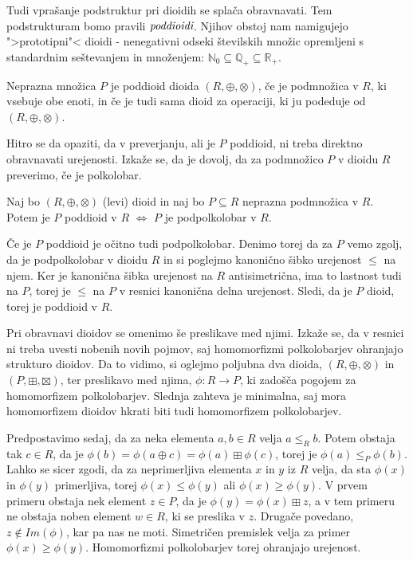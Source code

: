 \documentclass[mat1]{fmfdelo}
\newcommand{\N}{\mathbb{N}}
\newcommand{\No}{\N_0}
\newcommand{\Pplus}[1]{\mathbb{#1}_{+}}
\newcommand{\pojem}[1]{\ensuremath{\emph{#1}}}
\newcommand{\map}[3]{\ensuremath{{#1}:{#2}\rightarrow{#3}}}
\begin{document}
Tudi vprašanje podstruktur pri dioidih se splača obravnavati. Tem podstrukturam bomo pravili \pojem{poddioidi}. Njihov obstoj nam namigujejo ">prototipni"< dioidi - nenegativni odseki številskih množic opremljeni s standardnim seštevanjem in množenjem: $\No\subseteq\Pplus{Q}\subseteq\Pplus{R}$.

\begin{definicija}
	Neprazna množica $P$ je poddioid dioida $(R, \oplus, \otimes)$, če je podmnožica v $R$, ki vsebuje obe enoti, in če je tudi sama dioid za operaciji, ki ju podeduje od $(R, \oplus, \otimes)$.
\end{definicija}

Hitro se da opaziti, da v preverjanju, ali je $P$ poddioid, ni treba direktno obravnavati urejenosti. Izkaže se, da je dovolj, da za podmnožico $P$ v dioidu $R$ preverimo, če je polkolobar.

\begin{trditev}
	\label{trd:poddioid}
	Naj bo $(R, \oplus, \otimes)$ (levi) dioid in naj bo $P\subseteq R$ neprazna podmnožica v $R$. Potem je $P$ poddioid v $R$ $\iff$ $P$ je podpolkolobar v $R$.
\end{trditev}

\begin{dokaz}
	Če je $P$ poddioid je očitno tudi podpolkolobar. Denimo torej da za $P$ vemo zgolj, da je podpolkolobar v dioidu $R$ in si poglejmo kanonično šibko urejenost $\leq$ na njem. Ker je kanonična šibka urejenost na $R$ antisimetrična, ima to lastnost tudi na $P$, torej je $\leq$ na $P$ v resnici kanonična delna urejenost. Sledi, da je $P$ dioid, torej je poddioid v $R$.
\end{dokaz}

Pri obravnavi dioidov se omenimo še preslikave med njimi. Izkaže se, da v resnici ni treba uvesti nobenih novih pojmov, saj homomorfizmi polkolobarjev ohranjajo strukturo dioidov. Da to vidimo, si oglejmo poljubna dva dioida, $(R, \oplus, \otimes)$ in $(P, \boxplus, \boxtimes)$, ter preslikavo med njima, $\map{\phi}{R}{P}$, ki zadošča pogojem za homomorfizem polkolobarjev. Slednja zahteva je minimalna, saj mora homomorfizem dioidov hkrati biti tudi homomorfizem polkolobarjev. 

Predpostavimo sedaj, da za neka elementa $a, b\in R$ velja $a\leq_R b$. Potem obstaja tak $c\in R$, da je $\phi(b) = \phi(a\oplus c) = \phi(a) \boxplus\phi(c)$, torej je $\phi(a) \leq_P\phi(b)$. Lahko se sicer zgodi, da za neprimerljiva elementa $x$ in $y$ iz $R$ velja, da sta $\phi(x)$ in $\phi(y)$ primerljiva, torej $\phi(x) \leq \phi(y)$ ali $\phi(x) \geq \phi(y)$. V prvem primeru obstaja nek element $z\in P$, da je $\phi(y) = \phi(x) \boxplus z$, a v tem primeru ne obstaja noben element $w\in R$, ki se preslika v $z$. Drugače povedano, $z\notin Im(\phi)$, kar pa nas ne moti. Simetričen premislek velja za primer $\phi(x) \geq \phi(y)$. Homomorfizmi polkolobarjev torej ohranjajo urejenost.
\end{document}
